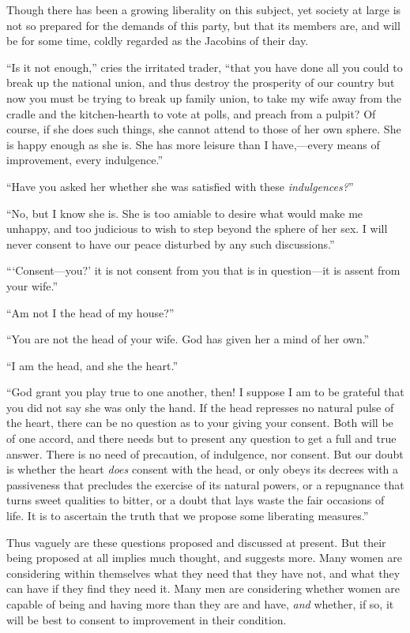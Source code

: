 Though there has been a growing liberality on this subject, yet
society at large is not so prepared for the demands of this party, but
that its members are, and will be for some time, coldly regarded as
the Jacobins of their day.

``Is it not enough,'' cries the irritated trader, ``that you have done
all you could to break up the national  union, and thus
destroy the prosperity of our country but now you must be trying to
break up family union, to take my wife away from the cradle and the
kitchen-hearth to vote at polls, and preach from a pulpit? Of course,
if she does such things, she cannot attend to those of her own sphere.
She is happy enough as she is. She has more leisure than I
have,---every means of improvement, every indulgence.''

``Have you asked her whether she was satisfied with these
\textit{indulgences?}''

``No, but I know she is. She is too amiable to desire what would make
me unhappy, and too judicious to wish to step beyond the sphere of her
sex. I will never consent to have our peace disturbed by any such
discussions.''

```Consent---you?' it is not consent from you that is in question---it
is assent from your wife.''

``Am not I the head of my house?''

``You are not the head of your wife. God has given her a mind of her
own.''

``I am the head, and she the heart.''

``God grant you play true to one another, then! I suppose I am to be
grateful that you did not say she was only the hand. If the head
represses no natural pulse of the heart, there can be no question as
to your giving your consent. Both will be of one accord, and there
needs but to present any question to get a full and true answer. There
is no need of precaution, of indulgence, nor consent. But our doubt is
whether the heart \textit{does} consent with the head, or only obeys
its decrees with a passiveness that precludes the exercise of its
natural  powers, or a repugnance that turns sweet qualities
to bitter, or a doubt that lays waste the fair occasions of life. It
is to ascertain the truth that we propose some liberating
measures.''

Thus vaguely are these questions proposed and discussed at present.
But their being proposed at all implies much thought, and suggests
more. Many women are considering within themselves what they need that
they have not, and what they can have if they find they need it. Many
men are considering whether women are capable of being and having more
than they are and have, \textit{and} whether, if so, it will be best
to consent to improvement in their condition.

